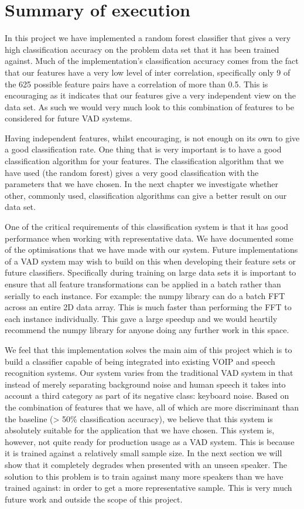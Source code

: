 \documentclass[ %
                    author={Sam Phippen},
                supervisor={Dr. Rafal Bogacz},
                     title={Real time voice activity detectors in noisy personal computing environments},
                  subtitle={},
                    degree={MEng},
                      year={2012} ]{thesis}
\begin{document}
\section{Summary of execution}

In this project we have implemented a random forest classifier that gives a
very high classification accuracy on the problem data set that it has been
trained against. Much of the implementation's classification accuracy comes
from the fact that our features have a very low level of inter correlation,
specifically only 9 of the 625 possible feature pairs have a correlation of
more than 0.5. This is encouraging as it indicates that our features give a
very independent view on the data set. As such we would very much look to
this combination of features to be considered for future VAD systems.

Having independent features, whilst encouraging, is not enough on its own to
give a good classification rate. One thing that is very important is to have a
good classification algorithm for your features. The classification algorithm
that we have used (the random forest) gives a very good classification with the
parameters that we have chosen. In the next chapter we investigate whether
other, commonly used, classification algorithms can give a better result on our
data set.

One of the critical requirements of this classification system is that it has
good performance when working with representative data. We have documented some
of the optimisations that we have made with our system. Future implementations
of a VAD system may wish to build on this when developing their feature sets or
future classifiers. Specifically during training on large data sets it is
important to ensure that all feature transformations can be applied in a batch
rather than serially to each instance. For example: the numpy library can do a
batch FFT across an entire 2D data array. This is much faster than performing
the FFT to each instance individually. This gave a large speedup and we would
heartily recommend the numpy library for anyone doing any further work in this
space.

We feel that this implementation solves the main aim of this project which is
to build a classifier capable of being integrated into existing VOIP and speech
recognition systems. Our system varies from the traditional VAD system in that
instead of merely separating background noise and human speech it takes into
account a third category as part of its negative class: keyboard noise.  Based
on the combination of features that we have, all of which are more discriminant
than the baseline (> 50\% classification accuracy), we believe that this system
is absolutely suitable for the application that we have chosen.  This system
is, however, not quite ready for production usage as a VAD system. This is
because it is trained against a relatively small sample size. In the next
section we will show that it completely degrades when presented with an unseen
speaker. The solution to this problem is to train against many more speakers
than we have trained against: in order to get a more representative sample.
This is very much future work and outside the scope of this project.
\end{document}
